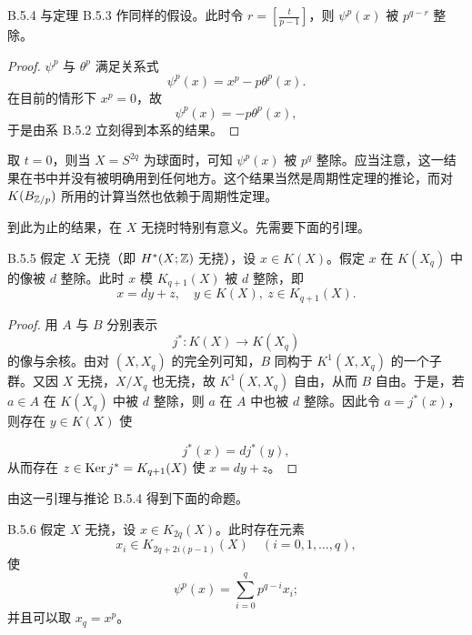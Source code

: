 \begin{corollary*}{B.5.4}
  与定理 B.5.3 作同样的假设。此时令 $r=\left[\frac{t}{p-1}\right]$，则 $\psi^p(x)$ 被 $p^{q-r}$ 整除。
\end{corollary*}

\begin{proof}
  $\psi^p$ 与 $\theta^p$ 满足关系式
  \[
    \psi^p(x)=x^p-p\theta^p(x).
  \]
  在目前的情形下 $x^p=0$，故
  \[
    \psi^p(x)=-p\theta^p(x),
  \]
  于是由系 B.5.2 立刻得到本系的结果。
\end{proof}

\begin{remark}{}
  取 $t=0$，则当 $X=S^{2q}$ 为球面时，可知 $\psi^p(x)$ 被 $p^q$ 整除。应当注意，这一结果在书中并没有被明确用到任何地方。这个结果当然是周期性定理的推论，而对 $K(B_{\mathbb{Z}/p})$ 所用的计算当然也依赖于周期性定理。
\end{remark}

到此为止的结果，在 $X$ 无挠时特别有意义。先需要下面的引理。

\begin{lemma*}{B.5.5}
  假定 $X$ 无挠（即 $H^*(X;\mathbb{Z})$ 无挠），设 $x\in K(X)$。假定 $x$ 在 $K(X_q)$ 中的像被 $d$ 整除。此时 $x$ 模 $K_{q+1}(X)$ 被 $d$ 整除，即
  \[
    x=dy+z,\quad y\in K(X),\ z\in K_{q+1}(X).
  \]
\end{lemma*}

\begin{proof}
  用 $A$ 与 $B$ 分别表示
  \[
    j^*\colon K(X)\to K(X_q)
  \]
  的像与余核。由对 $(X,X_q)$ 的完全列可知，$B$ 同构于 $K^1(X,X_q)$ 的一个子群。又因 $X$ 无挠，$X/X_q$ 也无挠，故 $K^1(X,X_q)$ 自由，从而 $B$ 自由。于是，若 $a\in A$ 在 $K(X_q)$ 中被 $d$ 整除，则 $a$ 在 $A$ 中也被 $d$ 整除。因此令 $a=j^*(x)$，则存在 $y\in K(X)$ 使

  \[
    j^*(x)=dj^*(y),
  \]
  从而存在 $z\in\operatorname{Ker} j^*=K_{q+1}(X)$ 使 $x=dy+z$。
\end{proof}

由这一引理与推论 B.5.4 得到下面的命题。

\begin{proposition*}{B.5.6}
  假定 $X$ 无挠，设 $x\in K_{2q}(X)$。此时存在元素
  \[
    x_i\in K_{2q+2i(p-1)}(X)\quad(i=0,1,\dots,q),
  \]
  使
  \[
    \psi^p(x)=\sum_{i=0}^{q}p^{q-i}x_i;
  \]
  并且可以取 $x_q=x^p$。
\end{proposition*}

